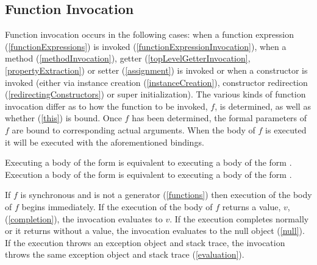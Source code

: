 \documentclass{article}
\begin{document}


\subsection{Function Invocation}

\LMHash{}
Function invocation occurs in the following cases: when a function expression (\ref{functionExpressions}) is invoked (\ref{functionExpressionInvocation}), when a method (\ref{methodInvocation}), getter (\ref{topLevelGetterInvocation}, \ref{propertyExtraction}) or setter (\ref{assignment}) is invoked or when a constructor is invoked (either via instance creation (\ref{instanceCreation}), constructor redirection (\ref{redirectingConstructors}) or super initialization).
The various kinds of function invocation differ as to how the function to be invoked, $f$, is determined, as well as whether \THIS{} (\ref{this}) is bound.
Once $f$ has been determined, the formal parameters of $f$ are bound to corresponding actual arguments.
When the body of $f$ is executed it will be executed with the aforementioned bindings.

\LMHash{}
Executing a body of the form  is equivalent to executing a body of the form .
Execution a body of the form  is equivalent to executing a body of the form .

\LMHash{}
If $f$ is synchronous and is not a generator (\ref{functions}) then execution of the body of $f$ begins immediately.
If the execution of the body of $f$ returns a value, $v$, (\ref{completion}), the invocation evaluates to $v$.
If the execution completes normally or it returns without a value, the invocation evaluates to the null object (\ref{null}).
If the execution throws an exception object and stack trace, the invocation throws the same exception object and stack trace (\ref{evaluation}).

\end{document}
